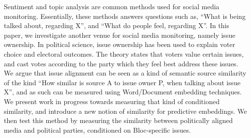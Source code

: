 Sentiment and topic analysis are common methods used for social media monitoring. Essentially, these methods answers questions such as, ``What is being talked about, regarding X'', and ``What do people feel, regarding X''. In this paper, we investigate another venue for social media monitoring, namely issue ownership. In political science, issue ownership has been used to explain voter choice and electoral outcomes. The theory states that voters value certain issues, and cast votes according to the party which they feel best address these issues. We argue that issue alignment can be seen as a kind of semantic source similarity of the kind ``How similar is source A to issue owner P, when talking about issue X'', and as such can be measured using Word/Document embedding techniques. We present work in progress towards measuring that kind of conditioned similarity, and introduce a new notion of similarity for predictive embeddings. We then test this method by measuring the similarity between politically aligned media and political parties, conditioned on Bloc-specific issues.
